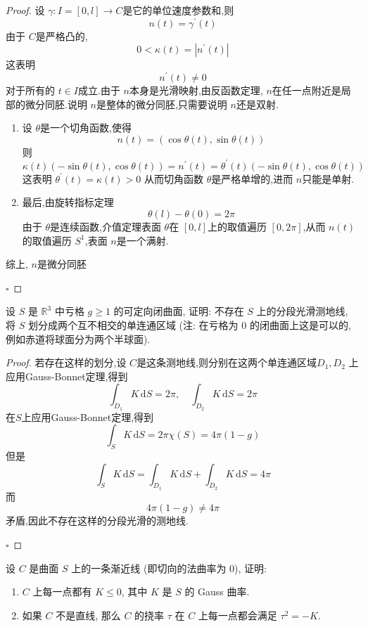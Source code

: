 \documentclass[../../main.tex]{subfiles}
\begin{document}
\begin{proof}
    设 \(   \gamma :I= [0,l]\to C  \)是它的单位速度参数和,则 \[
    n\left( t \right)=  \gamma ^{\prime} \left( t \right)  
    \]由于 \(  C  \)是严格凸的, \[
    0<  \kappa \left( t \right)= \left| n^{\prime} \left( t \right)  \right|  
    \]   这表明\[
    n^{\prime} \left( t \right)\neq 0 
    \]对于所有的 \(  t\in I  \)成立.由于 \(  n  \)本身是光滑映射,由反函数定理, \(  n  \)在任一点附近是局部的微分同胚.说明 \(  n  \)是整体的微分同胚,只需要说明 \(  n  \)还是双射.
    \begin{enumerate}
        \item   设 \(   \theta   \)是一个切角函数,使得 \[
    n\left( t \right)= \left( \cos  \theta \left( t \right),\sin  \theta \left( t \right)   \right)  
    \] 则  \[
   \kappa \left( t \right)\left( -\sin  \theta \left( t \right),\cos  \theta \left( t \right)   \right)=     n^{\prime} \left( t \right)=  \theta ^{\prime} \left( t \right) \left( -\sin  \theta \left( t \right),\cos  \theta \left( t \right)   \right)  
    \]这表明 \(   \theta ^{\prime} \left( t \right)=  \kappa \left( t \right)> 0    \) 从而切角函数 \(   \theta   \)是严格单增的,进而 \(  n  \)只能是单射.
    \item 最后,由旋转指标定理 \[
     \theta \left( l \right)- \theta \left( 0 \right)= 2\pi   
    \]  由于 \(   \theta   \)是连续函数,介值定理表面 \(   \theta   \)在 \(  \left[ 0,l \right]   \)上的取值遍历 \(  \left[ 0,2\pi  \right]   \),从而 \(  n\left( t \right)   \)的取值遍历 \(  S^{1}  \),表面 \(  n  \)是一个满射.       
    \end{enumerate}
    综上, \(  n  \)是微分同胚 
    
    \hfill $\square$
\end{proof}
\begin{problem}
 设 $S$ 是 $\mathbb{R}^3$ 中亏格 $g \ge 1$ 的可定向闭曲面, 证明: 不存在 $S$ 上的分段光滑测地线, 将 $S$ 划分成两个互不相交的单连通区域 (注: 在亏格为 $0$ 的闭曲面上这是可以的, 例如赤道将球面分为两个半球面).
\end{problem}
\begin{proof}
    若存在这样的划分,设 \(  C  \)是这条测地线,则分别在这两个单连通区域\(  D_1,D_2  \) 上应用Gauss-Bonnet定理,得到\[
    \int_{D_1}K\,\mathrm{d} S= 2\pi ,\quad \int_{D_2}K\,\mathrm{d} S= 2\pi 
    \]在\(  S  \)上应用Gauss-Bonnet定理,得到 \[
    \int_{S}K\,\mathrm{d} S= 2\pi \chi \left( S \right)= 4\pi \left( 1-g \right)  
    \] 但是 \[
    \int_{S}K\,\mathrm{d} S= \int_{D_1}K\,\mathrm{d} S+ \int_{D_2}K\,\mathrm{d} S= 4\pi 
    \]而 \[
    4\pi \left( 1-g \right)\neq 4\pi  
    \]矛盾,因此不存在这样的分段光滑的测地线.

    \hfill $\square$
\end{proof}
\begin{problem}
设 $C$ 是曲面 $S$ 上的一条渐近线 (即切向的法曲率为 $0$), 证明:
\begin{enumerate}
\item $C$ 上每一点都有 $K \le 0$, 其中 $K$ 是 $S$ 的 Gauss 曲率.
\item 如果 $C$ 不是直线, 那么 $C$ 的挠率 $\tau$ 在 $C$ 上每一点都会满足 $\tau^2 = -K$.
\end{enumerate}

\end{problem}
\end{document}
